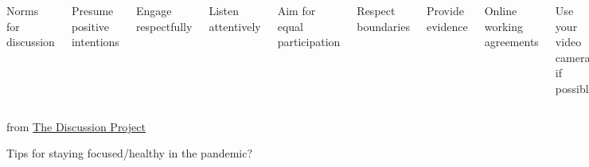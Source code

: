 \documentclass[aspectratio=169,12pt,t]{beamer}
\begin{document}
\begin{frame}{}

  \begin{columns}

      \centerline{\color{title} Norms for discussion}

      \bigskip

      {\footnotesize
      \bi
    \item Presume positive intentions
    \item Engage respectfully
    \item Listen attentively
    \item Aim for equal participation
    \item Respect boundaries
    \item Provide evidence
      \ei }



      \centerline{\color{title} Online working agreements}

      \bigskip

      \footnotesize

      \bi
    \item Use your video camera if possible
    \item Use names to address each other
    \item Use features (mute, raise hand, chat, etc) appropriately
    \item Be okay with silence
    \item Start and end on time
      \ei

  \end{columns}

\bigskip \bigskip \bigskip
\bigskip \bigskip \bigskip

\hfill {\scriptsize from \href{https://discussion.education.wisc.edu}{The Discussion Project}}

\end{frame}





\begin{frame}[c]{}

\centerline{\Large \color{title} Tips for staying focused/healthy in
  the pandemic?}

\end{frame}
\end{document}

